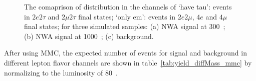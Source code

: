 \begin{figure}[!htbp]
\centering
{}
\caption{
The comaprison of \mfl distribution in the channels of
`have tau': events in $2e2\tau$ and $2\mu2\tau$ final states; `only em': events in $2e2\mu$, $4e$ and $4\mu$ final states;
for three simulated samples:
(a) NWA signal at 300~\gev;
(b) NWA signal at 1000~\gev;
(c) \qqZZ background.
}
\label{fig:mmc_4l_mass}
\end{figure}

After using MMC, the expected number of events for signal and \qqZZ background in different lepton flavor channels are shown in table~\ref{tab:yield_diffMass_mmc} by normalizing to the luminosity of 80~\ifb.

